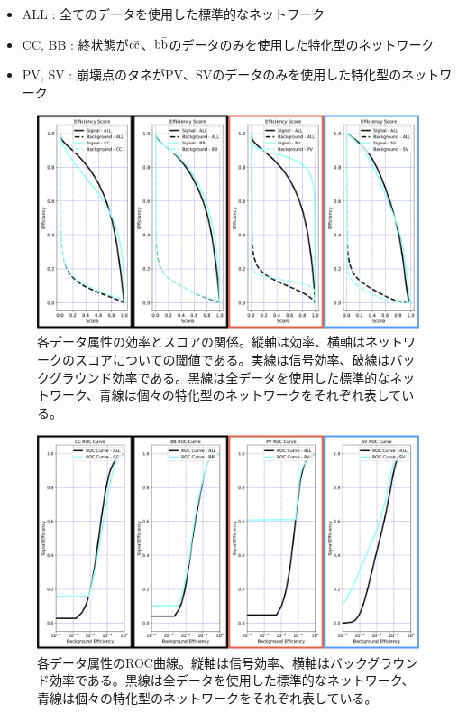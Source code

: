 \begin{itemize}
 \item ALL : 全てのデータを使用した標準的なネットワーク
 \item CC, BB : 終状態が$\rm c\bar{c}$、$\rm b\bar{b}$のデータのみを使用した特化型のネットワーク
 \item PV, SV : 崩壊点のタネがPV、SVのデータのみを使用した特化型のネットワーク
\end{itemize}

\begin{figure}[htbp]
 \centering
 \includegraphics[width=1.0\textwidth, clip]{Figure/3Networks/3-4-3-2EfficiencyCurve.png}
 \caption[各データ属性の効率とスコアの関係]{各データ属性の効率とスコアの関係。縦軸は効率、横軸はネットワークのスコアについての閾値である。実線は信号効率、破線はバックグラウンド効率である。黒線は全データを使用した標準的なネットワーク、青線は個々の特化型のネットワークをそれぞれ表している。}
 \label{3-4-3-2EfficiencyCurve}
\end{figure}

\begin{figure}[htbp]
 \centering
 \includegraphics[width=1.0\textwidth, clip]{Figure/3Networks/3-4-3-2ROCCurve.png}
 \caption[各データ属性のROC曲線]{各データ属性のROC曲線。縦軸は信号効率、横軸はバックグラウンド効率である。黒線は全データを使用した標準的なネットワーク、青線は個々の特化型のネットワークをそれぞれ表している。}
 \label{3-4-3-2ROCCurve}
\end{figure}


